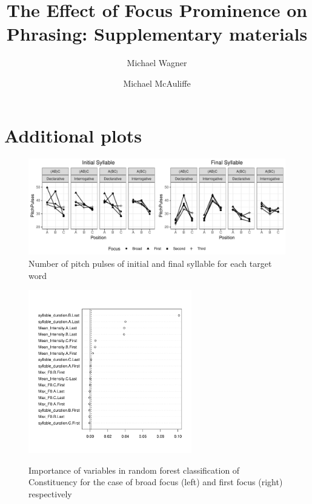 \documentclass[preprint,review,12pt,authoryear,times]{elsarticle}
\begin{document}
\begin{frontmatter}


\title{The Effect of Focus Prominence on Phrasing: Supplementary materials}

\author{Michael Wagner}
\author{Michael McAuliffe}



\address{Department of Linguistics, McGill University \\ 1085 Doctor Penfield Avenue, Montr\'eal, Qu\'ebec, H3A 1A7\\Canada}

\end{frontmatter}


\tableofcontents

\newpage

\section{Additional plots}


\begin{figure}[htb!]
	\begin{center}
		\includegraphics[width=5in]{Figures/PitchPulses.pdf}
		\caption{Number of pitch pulses of initial and final syllable for each target word}
		\label{figurePitchPulses}
	\end{center}
\end{figure}

\begin{figure}[ht!]
	\begin{center}
	{\footnotesize
		\includegraphics[width=2.8in]{Figures/phrasingFirstCVarimp.pdf}	
		}
		\caption{Importance of variables in random forest classification of Constituency for the case of broad focus (left) and first focus (right) respectively}
		\label{focusForestFirstC}
	\end{center}
\end{figure}
\end{document}
